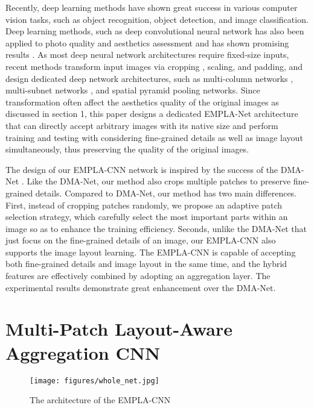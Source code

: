 \documentclass[10pt,twocolumn,letterpaper]{article}
\begin{document}
Recently, deep learning methods have shown great success in various 
computer vision tasks, such as object recognition, object detection, 
and image classification. Deep learning methods, such as deep 
convolutional neural network has also been applied to photo quality and 
aesthetics assessment and has shown promising results \cite{Lu:2014:ACMMM}
\cite{Lu:2015:ICCV} \cite{Tang:2014:CVPR}. As most deep neural network 
architectures require fixed-size inputs, recent methods transform input images
via cropping \cite{Kang:2014:CVPR}, scaling, and padding, 
and design dedicated deep network architectures, 
such as multi-column networks \cite{Lu:2014:ACMMM} \cite{Lu:2015:ICCV}, 
multi-subnet networks \cite{Mai:2016:CVPR}, and spatial pyramid pooling 
networks\cite{Kaiming:archive:2014}. Since transformation often affect the 
aesthetics quality of the original images as discussed in section 1, this 
paper designs a dedicated EMPLA-Net architecture that can directly accept 
arbitrary images with its native size and perform training and testing 
with considering fine-grained details as well as image layout simultaneously, 
thus preserving the quality of the original images.

The design of our EMPLA-CNN network is inspired by the success of the 
DMA-Net \cite{Lu:2015:ICCV}. Like the DMA-Net, our method also crops 
multiple patches to preserve fine-grained details. Compared to DMA-Net, 
our method has two main differences. First, instead of cropping patches
randomly, we propose an adaptive patch selection strategy, which carefully
select the most important parts within an image so as to enhance the training 
efficiency. Seconds, unlike the DMA-Net that just focus on the fine-grained 
details of an image, our EMPLA-CNN also supports the image layout learning.
The EMPLA-CNN is capable of accepting both fine-grained details and image layout in the same time, and the hybrid features are effectively combined by adopting an aggregation layer. The experimental results demonstrate great enhancement over the DMA-Net.
\section{Multi-Patch Layout-Aware Aggregation CNN}
\begin{figure}
	\centering
	\texttt{[image: figures/whole\_net.jpg]}
	\label{whole_net}
	\caption{The architecture of the EMPLA-CNN}
\end{figure}
\end{document}
